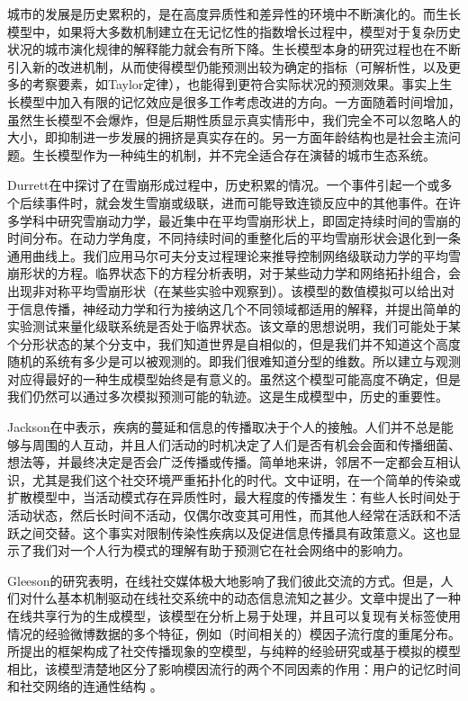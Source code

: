 城市的发展是历史累积的，是在高度异质性和差异性的环境中不断演化的。而生长模型中，如果将大多数机制建立在无记忆性的指数增长过程中，模型对于复杂历史状况的城市演化规律的解释能力就会有所下降。生长模型本身的研究过程也在不断引入新的改进机制，从而使得模型仍能预测出较为确定的指标（可解析性，以及更多的考察要素，如Taylor定律\cite{Giometto7755}），也能得到更符合实际状况的预测效果。事实上生长模型中加入有限的记忆效应是很多工作考虑改进的方向\cite{Schaigorodsky2018}。一方面随着时间增加，虽然生长模型不会爆炸，但是后期性质显示真实情形中，我们完全不可以忽略人的大小，即抑制进一步发展的拥挤是真实存在的。另一方面年龄结构也是社会主流问题。生长模型作为一种纯生的机制，并不完全适合存在演替的城市生态系统。

Durrett在\cite{gleeson2017temporal}中探讨了在雪崩形成过程中，历史积累的情况。一个事件引起一个或多个后续事件时，就会发生雪崩或级联，进而可能导致连锁反应中的其他事件。在许多学科中研究雪崩动力学，最近集中在平均雪崩形状上，即固定持续时间的雪崩的时间分布。在动力学角度，不同持续时间的重整化后的平均雪崩形状会退化到一条通用曲线上。我们应用马尔可夫分支过程理论来推导控制网络级联动力学的平均雪崩形状的方程。临界状态下的方程分析表明，对于某些动力学和网络拓扑组合，会出现非对称平均雪崩形状（在某些实验中观察到）。该模型的数值模拟可以给出对于信息传播，神经动力学和行为接纳这几个不同领域都适用的解释，并提出简单的实验测试来量化级联系统是否处于临界状态。该文章的思想说明，我们可能处于某个分形状态的某个分支中，我们知道世界是自相似的，但是我们并不知道这个高度随机的系统有多少是可以被观测的。即我们很难知道分型的维数。所以建立与观测对应得最好的一种生成模型始终是有意义的。虽然这个模型可能高度不确定，但是我们仍然可以通过多次模拟预测可能的轨迹。这是生成模型中，历史的重要性。

Jackson在\cite{akbarpour2018diffusion}中表示，疾病的蔓延和信息的传播取决于个人的接触。人们并不总是能够与周围的人互动，并且人们活动的时机决定了人们是否有机会会面和传播细菌、想法等，并最终决定是否会广泛传播或传播。简单地来讲，邻居不一定都会互相认识，尤其是我们这个社交环境严重拓扑化的时代。文中证明，在一个简单的传染或扩散模型中，当活动模式存在异质性时，最大程度的传播发生：有些人长时间处于活动状态，然后长时间不活动，仅偶尔改变其可用性，而其他人经常在活跃和不活跃之间交替。这个事实对限制传染性疾病以及促进信息传播具有政策意义。这也显示了我们对一个人行为模式的理解有助于预测它在社会网络中的影响力。

Gleeson的研究\cite{gleeson2016effects}表明，在线社交媒体极大地影响了我们彼此交流的方式。但是，人们对什么基本机制驱动在线社交系统中的动态信息流知之甚少。文章中提出了一种在线共享行为的生成模型，该模型在分析上易于处理，并且可以复现有关标签使用情况的经验微博数据的多个特征，例如（时间相关的）模因子流行度的重尾分布。 所提出的框架构成了社交传播现象的空模型，与纯粹的经验研究或基于模拟的模型相比，该模型清楚地区分了影响模因流行的两个不同因素的作用：用户的记忆时间和社交网络的连通性结构 。

